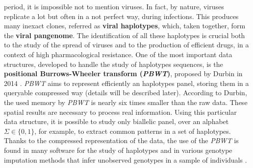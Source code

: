 \documentclass[a4paper,11pt, oneside]{article}
\newcommand{\pb}[1]{\todo[backgroundcolor=red]{\textbf{PB} #1}}
\newcommand{\dc}[1]{\todo[[backgroundcolor=yellow]{\textbf{DC} #1}}
\begin{document}
period, it is impossible not to mention viruses. In fact, by nature, viruses
replicate a lot but often in a not perfect way, during infections. This produces
many inexact clones, referred as \textbf{viral haplotypes}, which, taken
together, form the \textbf{viral pangenome}. The identification of all these
haplotypes is crucial both to the study of the spread of viruses and to the
production of efficient drugs, in a context of high pharmacological resistance.
One of the most important data structures, developed to handle the
study of haplotypes sequences, is the \textbf{positional Burrows-Wheeler
  transform (\textit{PBWT})}, proposed by Durbin in 2014
\cite{pbwt_durbin}. \textit{PBWT} 
aims to represent efficiently an haplotypes panel, storing them in a queryable
compressed way (details will be described later). According to Durbin, the used
memory by \textit{PBWT} is nearly six times smaller than the raw data. These
spatial results are necessary to process real information. 
Using this particular data structure, it is
possible to study only biallelic panel, over an alphabet $\Sigma\in\{0,1\}$, for
example, to extract common patterns in a set of haplotypes. Thanks to
the compressed representation of the 
data, the use of the \textit{PBWT} is found in many 
software for the study of haplotypes and in various genotype imputation methods
that infer unobserved genotypes in a sample of individuals \cite{impute5}.
\end{document}
